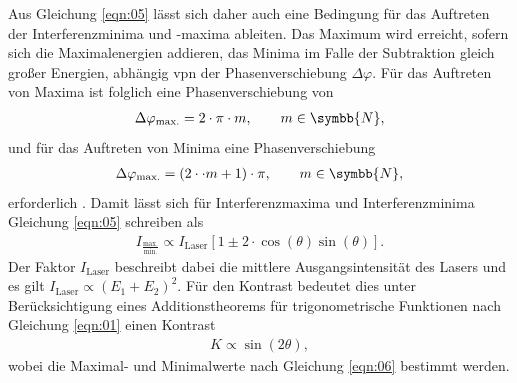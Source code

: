 \noindent Aus Gleichung \ref{eqn:05} lässt sich daher auch eine Bedingung für
das Auftreten der Interferenzminima und -maxima ableiten. Das Maximum wird
erreicht, sofern sich die Maximalenergien addieren, das Minima im Falle der
Subtraktion gleich großer Energien, abhängig vpn der Phasenverschiebung $\Delta
\varphi$. Für das Auftreten von Maxima ist folglich eine Phasenverschiebung von
\begin{align*}
  \Delta \varphi_\text{max.} = 2 \cdot \pi \cdot m, \qquad m \in \symbb{N},
\end{align*}
\noindent und für das Auftreten von Minima eine Phasenverschiebung
\begin{align*}
  \Delta \varphi_\text{max.} = (2 \cdot \cdot m + 1) \cdot \pi, \qquad m \in \symbb{N},
\end{align*}
\noindent erforderlich \cite{hecht}. Damit lässt sich für Interferenzmaxima und
Interferenzminima Gleichung \ref{eqn:05} schreiben als
\begin{align}
  I_{\frac{\text{max.}}{\text{min.}}} \propto I_\text{Laser} \left[1 \pm 2 \cdot \cos(\theta) \sin(\theta) \right].
  \label{eqn:06}
\end{align}
\noindent Der Faktor $I_\text{Laser}$ beschreibt dabei die mittlere
Ausgangsintensität des Lasers und es gilt $I_\text{Laser} \propto (E_1 + E_2)^2$.
Für den Kontrast bedeutet dies unter Berücksichtigung eines Additionstheorems
für trigonometrische Funktionen nach Gleichung \ref{eqn:01} einen Kontrast
\begin{align*}
  K \propto \sin(2 \theta),
\end{align*}
\noindent wobei die Maximal- und Minimalwerte nach Gleichung \ref{eqn:06}
bestimmt werden.
